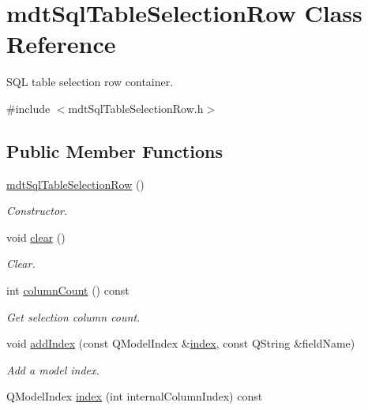 \hypertarget{classmdt_sql_table_selection_row}{\section{mdt\-Sql\-Table\-Selection\-Row Class Reference}
\label{classmdt_sql_table_selection_row}
}


S\-Q\-L table selection row container.  




{\ttfamily \#include $<$mdt\-Sql\-Table\-Selection\-Row.\-h$>$}

\subsection*{Public Member Functions}
\begin{DoxyCompactItemize}
\item 
\hyperlink{classmdt_sql_table_selection_row_a6195a8daa2fc45a039818a8c657debec}{mdt\-Sql\-Table\-Selection\-Row} ()
\begin{DoxyCompactList}\small\item\em Constructor. \end{DoxyCompactList}\item 
void \hyperlink{classmdt_sql_table_selection_row_a59a353e24957d5b1b72c31f08613171e}{clear} ()
\begin{DoxyCompactList}\small\item\em Clear. \end{DoxyCompactList}\item 
int \hyperlink{classmdt_sql_table_selection_row_a7c0a686867a9161bdeba4631871221b8}{column\-Count} () const 
\begin{DoxyCompactList}\small\item\em Get selection column count. \end{DoxyCompactList}\item 
void \hyperlink{classmdt_sql_table_selection_row_a6efff251e9434e726243aa5b493c1b2e}{add\-Index} (const Q\-Model\-Index \&\hyperlink{classmdt_sql_table_selection_row_a2531414ca23913415c9dc4889627c6d8}{index}, const Q\-String \&field\-Name)
\begin{DoxyCompactList}\small\item\em Add a model index. \end{DoxyCompactList}\item 
Q\-Model\-Index \hyperlink{classmdt_sql_table_selection_row_a2531414ca23913415c9dc4889627c6d8}{index} (int internal\-Column\-Index) const 

\end{DoxyCompactItemize}
